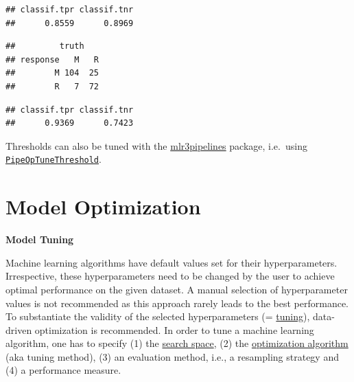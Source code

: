 \documentclass[
]{scrbook}
\newenvironment{Shaded}{\begin{snugshade}}{\end{snugshade}}
\newcommand{\FloatTok}[1]{\textcolor[rgb]{0.00,0.00,0.81}{#1}}
\newcommand{\FunctionTok}[1]{\textcolor[rgb]{0.00,0.00,0.00}{#1}}
\newcommand{\NormalTok}[1]{#1}
\newcommand{\SpecialCharTok}[1]{\textcolor[rgb]{0.00,0.00,0.00}{#1}}
\renewenvironment{Shaded} {\begin{snugshade}\small} {\end{snugshade}}
\begin{document}
\begin{Shaded}
\end{Shaded}

\begin{verbatim}
## classif.tpr classif.tnr 
##      0.8559      0.8969
\end{verbatim}

\begin{Shaded}
\end{Shaded}

\begin{verbatim}
##         truth
## response   M   R
##        M 104  25
##        R   7  72
\end{verbatim}

\begin{Shaded}
\end{Shaded}

\begin{verbatim}
## classif.tpr classif.tnr 
##      0.9369      0.7423
\end{verbatim}

Thresholds can also be tuned with the \href{https://mlr3pipelines.mlr-org.com}{mlr3pipelines} package, i.e.~using \href{https://mlr3pipelines.mlr-org.com/reference/mlr_pipeops_tunethreshold.html}{\texttt{PipeOpTuneThreshold}}.

\hypertarget{optimization}{%
\chapter{Model Optimization}\label{optimization}}

\textbf{Model Tuning}

Machine learning algorithms have default values set for their hyperparameters.
Irrespective, these hyperparameters need to be changed by the user to achieve optimal performance on the given dataset.
A manual selection of hyperparameter values is not recommended as this approach rarely leads to the best performance.
To substantiate the validity of the selected hyperparameters (= \protect\hyperlink{tuning}{tuning}), data-driven optimization is recommended.
In order to tune a machine learning algorithm, one has to specify (1) the \protect\hyperlink{tuning-optimization}{search space}, (2) the \protect\hyperlink{tuning-algorithms}{optimization algorithm} (aka tuning method), (3) an evaluation method, i.e., a resampling strategy and (4) a performance measure.
\end{document}
